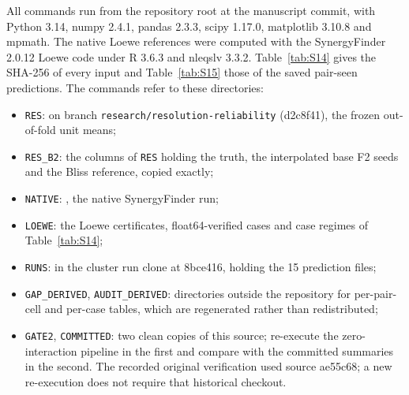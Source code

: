 \documentclass[11pt]{article}
\begin{document}
{\raggedright
All commands run from the repository root at the manuscript commit, with Python 3.14, numpy 2.4.1, pandas 2.3.3, scipy 1.17.0, matplotlib 3.10.8 and mpmath. The native Loewe references were computed with the SynergyFinder 2.0.12 Loewe code under R 3.6.3 and nleqslv 3.3.2. Table~\ref{tab:S14} gives the SHA-256 of every input and Table~\ref{tab:S15} those of the saved pair-seen predictions. The commands refer to these directories:
\begin{itemize}
\item \texttt{RES}:  on branch \texttt{research/resolution-reliability} (d2c8f41), the frozen out-of-fold unit means;
\item \texttt{RES\_B2}: the columns of \texttt{RES} holding the truth, the interpolated base F2 seeds and the Bliss reference, copied exactly;
\item \texttt{NATIVE}: , the native SynergyFinder run;
\item \texttt{LOEWE}: the Loewe certificates, float64-verified cases and case regimes of Table~\ref{tab:S14};
\item \texttt{RUNS}:  in the cluster run clone at 8bce416, holding the 15 prediction files;
\item \texttt{GAP\_DERIVED}, \texttt{AUDIT\_DERIVED}: directories outside the repository for per-pair-cell and per-case tables, which are regenerated rather than redistributed;
\item \texttt{GATE2}, \texttt{COMMITTED}: two clean copies of this source; re-execute the zero-interaction pipeline in the first and compare with the committed summaries in the second. The recorded original verification used source ae55c68; a new re-execution does not require that historical checkout.
\end{itemize}
\par}
\end{document}
